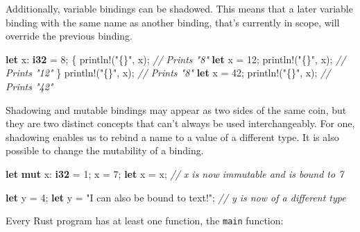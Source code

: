 \documentclass[a4paper,]{book}
\newenvironment{Shaded}{\begin{snugshade}}{\end{snugshade}}
\newcommand{\KeywordTok}[1]{\textcolor[rgb]{0.13,0.29,0.53}{\textbf{{#1}}}}
\newcommand{\DecValTok}[1]{\textcolor[rgb]{0.00,0.00,0.81}{{#1}}}
\newcommand{\StringTok}[1]{\textcolor[rgb]{0.31,0.60,0.02}{{#1}}}
\newcommand{\CommentTok}[1]{\textcolor[rgb]{0.56,0.35,0.01}{\textit{{#1}}}}
\newcommand{\OtherTok}[1]{\textcolor[rgb]{0.56,0.35,0.01}{{#1}}}
\newcommand{\NormalTok}[1]{{#1}}
\begin{document}
Additionally, variable bindings can be shadowed. This means that a later
variable binding with the same name as another binding, that's currently
in scope, will override the previous binding.

\begin{Shaded}
\begin{Highlighting}[]
\KeywordTok{let} \NormalTok{x: }\KeywordTok{i32} \NormalTok{= }\DecValTok{8}\NormalTok{;}
\NormalTok{\{}
    \OtherTok{println!}\NormalTok{(}\StringTok{"\{\}"}\NormalTok{, x); }\CommentTok{// Prints "8"}
    \KeywordTok{let} \NormalTok{x = }\DecValTok{12}\NormalTok{;}
    \OtherTok{println!}\NormalTok{(}\StringTok{"\{\}"}\NormalTok{, x); }\CommentTok{// Prints "12"}
\NormalTok{\}}
\OtherTok{println!}\NormalTok{(}\StringTok{"\{\}"}\NormalTok{, x); }\CommentTok{// Prints "8"}
\KeywordTok{let} \NormalTok{x =  }\DecValTok{42}\NormalTok{;}
\OtherTok{println!}\NormalTok{(}\StringTok{"\{\}"}\NormalTok{, x); }\CommentTok{// Prints "42"}
\end{Highlighting}
\end{Shaded}

Shadowing and mutable bindings may appear as two sides of the same coin,
but they are two distinct concepts that can't always be used
interchangeably. For one, shadowing enables us to rebind a name to a
value of a different type. It is also possible to change the mutability
of a binding.

\begin{Shaded}
\begin{Highlighting}[]
\KeywordTok{let} \KeywordTok{mut} \NormalTok{x: }\KeywordTok{i32} \NormalTok{= }\DecValTok{1}\NormalTok{;}
\NormalTok{x = }\DecValTok{7}\NormalTok{;}
\KeywordTok{let} \NormalTok{x = x; }\CommentTok{// x is now immutable and is bound to 7}

\KeywordTok{let} \NormalTok{y = }\DecValTok{4}\NormalTok{;}
\KeywordTok{let} \NormalTok{y = }\StringTok{"I can also be bound to text!"}\NormalTok{; }\CommentTok{// y is now of a different type}
\end{Highlighting}
\end{Shaded}


Every Rust program has at least one function, the \texttt{main}
function:
\end{document}
